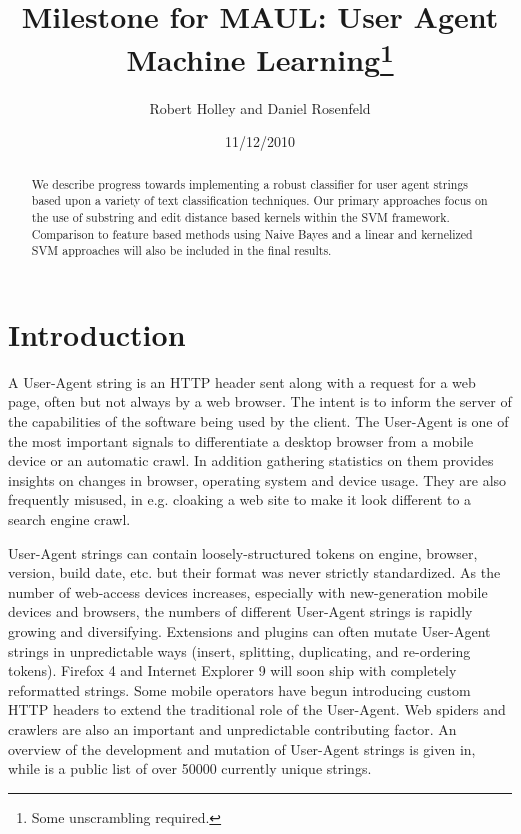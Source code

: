\documentclass[10pt]{article}
\title{Milestone for MAUL: User Agent Machine Learning\footnote{Some unscrambling required.} }
\author{Robert Holley and Daniel Rosenfeld}
\date{11/12/2010}
\begin{document}
\maketitle
\begin{abstract}
We describe progress towards implementing a robust classifier for user agent strings based upon a variety of text classification techniques.  Our primary approaches focus on the use of substring and edit distance based kernels within the SVM framework.  Comparison to feature based methods using Naive Bayes and a linear and kernelized SVM approaches will also be included in the final results. 
\end{abstract}


\section{Introduction}
A User-Agent string is an HTTP header sent along with a request for a web page, often but not always by a web browser.\cite{httprfc} The intent is to inform the server
of the capabilities of the software being used by the client. The User-Agent is
one of the most important signals to differentiate a desktop browser from a
mobile device or an automatic crawl. In addition gathering statistics on them
provides insights on changes in browser, operating system and device usage. They
are also frequently misused, in e.g. cloaking a web site to make it look
different to a search engine crawl.

User-Agent strings can contain loosely-structured tokens on engine, browser,
version, build date, etc. but their format was never strictly standardized.\cite{httprfc}
As the number of web-access devices increases, especially with new-generation
mobile devices and browsers, the numbers of different User-Agent strings is
rapidly growing and diversifying. Extensions and plugins can often mutate
User-Agent strings in unpredictable ways (insert, splitting, duplicating, and
re-ordering tokens). Firefox 4 and Internet Explorer 9 will soon ship with
completely reformatted strings. Some mobile operators have begun introducing
custom HTTP headers to extend the traditional role of the User-Agent.\cite{mobile} Web spiders and crawlers are also an important and unpredictable contributing factor.
An overview of the development and mutation of User-Agent strings is given in,\cite{history} while is a public list of over 50000 currently unique strings.\cite{uatracker}
\end{document}
